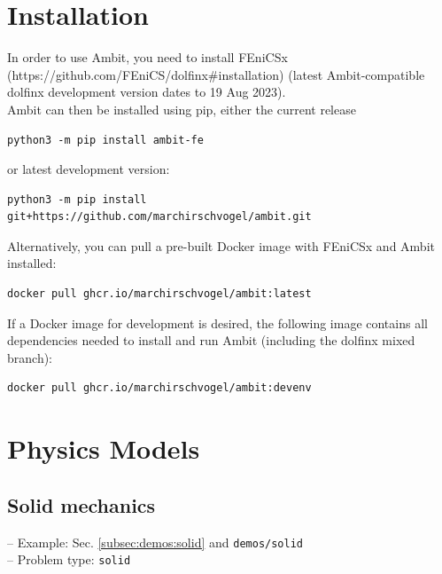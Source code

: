 \documentclass[a4paper,12pt]{report}
\begin{document}

\section{Installation}\label{sec:inst}

In order to use Ambit, you need to install FEniCSx (https://github.com/FEniCS/dolfinx\#installation) (latest Ambit-compatible dolfinx development version dates to 19 Aug 2023).\\

Ambit can then be installed using pip, either the current release
\begin{verbatim}
python3 -m pip install ambit-fe
\end{verbatim}

or latest development version:
\begin{verbatim}
python3 -m pip install git+https://github.com/marchirschvogel/ambit.git
\end{verbatim}

Alternatively, you can pull a pre-built Docker image with FEniCSx and Ambit installed:
\begin{verbatim}
docker pull ghcr.io/marchirschvogel/ambit:latest
\end{verbatim}

If a Docker image for development is desired, the following image contains all dependencies needed to install and run Ambit (including the dolfinx mixed branch):
\begin{verbatim}
docker pull ghcr.io/marchirschvogel/ambit:devenv
\end{verbatim}

\section{Physics Models}\label{sec:phys}

\subsection{Solid mechanics}\label{subsec:solid}

-- Example: Sec. \ref{subsec:demos:solid} and \verb"demos/solid"\\

-- Problem type: \verb.solid.\\
\end{document}
